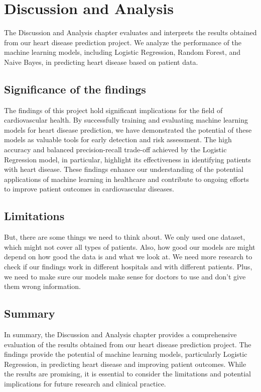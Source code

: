 \chapter{Discussion and Analysis}
\label{ch:evaluation}

The Discussion and Analysis chapter evaluates and interprets the results obtained from our heart disease prediction project. We analyze the performance of the machine learning models, including Logistic Regression, Random Forest, and Naive Bayes, in predicting heart disease based on patient data.

\section{Significance of the findings}
The findings of this project hold significant implications for the field of cardiovascular health. By successfully training and evaluating machine learning models for heart disease prediction, we have demonstrated the potential of these models as valuable tools for early detection and risk assessment. The high accuracy and balanced precision-recall trade-off achieved by the Logistic Regression model, in particular, highlight its effectiveness in identifying patients with heart disease. These findings enhance our understanding of the potential applications of machine learning in healthcare and contribute to ongoing efforts to improve patient outcomes in cardiovascular diseases.

\section{Limitations} %
But, there are some things we need to think about. We only used one dataset, which might not cover all types of patients. Also, how good our models are might depend on how good the data is and what we look at. We need more research to check if our findings work in different hospitals and with different patients. Plus, we need to make sure our models make sense for doctors to use and don't give them wrong information.

\section{Summary}
In summary, the Discussion and Analysis chapter provides a comprehensive evaluation of the results obtained from our heart disease prediction project. The findings provide the potential of machine learning models, particularly Logistic Regression, in predicting heart disease and improving patient outcomes. While the results are promising, it is essential to consider the limitations and potential implications for future research and clinical practice. 